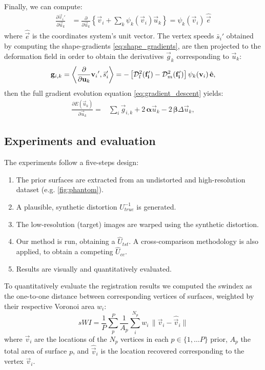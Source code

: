 Finally, we can compute:
  \begin{align}
  \frac{\partial \vec{v}_i'}{\partial \vec{u}_k} &= \frac{\partial}{\partial \vec{u}_k}
  \left\{ \vec{v}_i + \sum_k \psi_k(\vec{v}_i) \vec{u}_k \right\}
  = \psi_k(\vec{v}_i)\, \hat{\vec{e}}
  \label{eq:basis_derivative}
  \end{align}
  where $\hat{\vec{e}}$ is the coordinates system's unit vector.
The vertex speeds $\bar{s}_i'$ obtained by computing the shape-gradients \autoref{eq:shape_gradients},
	are then projected to the deformation field in order to obtain the derivatives $\vec{g}_k$
	corresponding to $\vec{u}_k$:
  \begin{equation}
  \vec{g}_{i,k} = \left\langle \frac{\partial}{\partial \vec{u}_k}{\vec{v}_i}', \bar{s}_i'\right\rangle
  = - \left[ \mdist{f_i'}{l} - \mdist{f_i'}{m} \right] \psi_k(\vec{v}_i)\, \hat{\vec{e}},
  \end{equation}
  then the full gradient evolution equation \eqref{eq:gradient_descent} yields:
  \begin{align}
  \frac{\partial E(\vec{u}_k)}{\partial \vec{u}_k} =
  &\underset{i}{\sum} \vec{g}_{i,k} +2\, \boldsymbol{\alpha} \vec{u}_k
  -2\, \boldsymbol{\beta} \Delta \vec{u}_k,
  \label{eq:gradient_final}
  \end{align}



\subsection{Experiments and evaluation}
\label{sec:experiments_evaluation}
%
The experiments follow a five-steps design:
\begin{enumerate}
	\item The prior surfaces are extracted from an undistorted and high-resolution dataset
	  (e.g. \autoref{fig:phantom}).
	\item A plausible, synthetic distortion $U^{-1}_{true}$ is generated.
	\item The low-resolution (target) images are warped using the synthetic distortion.
	\item Our method is run, obtaining a $\hat{U}_{tst}$.
	  A cross-comparison methodology is also applied, to obtain a competing $\hat{U}_{cc}$.
	\item Results are visually and quantitatively evaluated.
\end{enumerate}

To quantitatively evaluate the registration results we computed the \gls*{swindex} as the one-to-one
  distance between corresponding vertices of surfaces, weighted by their respective
  Voronoi area $w_i$:
  \begin{equation}
  sWI = \frac{1}{P} \sum\limits_p^P \frac{1}{A_p} \sum\limits_i^{N_p} w_i\,\|
  \vec{v}_i - \hat{\vec{v}}_i \|
  \end{equation}
  where $\vec{v}_i$ are the locations of the $N_p$ vertices in each $p \in \{1, \dots P\}$
    prior, $A_p$ the total area of surface $p$, and $\hat{\vec{v}}_i$ is the location
    recovered corresponding to the vertex $\vec{v}_i$.

